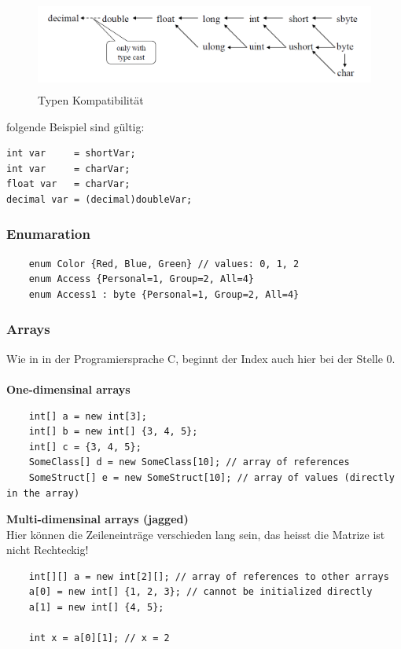\begin{figure}[h]
	\centering
	\includegraphics[height=3cm, ]{images/CSharp/TypenKompatibilitaet}
	\caption{Typen Kompatibilität}
\end{figure}

folgende Beispiel sind gültig:

\begin{lstlisting}
int var     = shortVar;
int var     = charVar;
float var   = charVar;
decimal var = (decimal)doubleVar;
\end{lstlisting}

\subsubsection{Enumaration}
\begin{lstlisting}
	enum Color {Red, Blue, Green} // values: 0, 1, 2
	enum Access {Personal=1, Group=2, All=4}
	enum Access1 : byte {Personal=1, Group=2, All=4}
\end{lstlisting}

\subsubsection{Arrays}
Wie in in der Programiersprache C, beginnt der Index auch hier bei der Stelle 0.\\ \\
\textbf{One-dimensinal arrays}
\begin{lstlisting}
	int[] a = new int[3];
	int[] b = new int[] {3, 4, 5};
	int[] c = {3, 4, 5};
	SomeClass[] d = new SomeClass[10]; // array of references
	SomeStruct[] e = new SomeStruct[10]; // array of values (directly in the array)
\end{lstlisting}

\textbf{Multi-dimensinal arrays (jagged)}\\
Hier können die Zeileneinträge verschieden lang sein, das heisst die Matrize ist nicht Rechteckig!
\begin{lstlisting}
	int[][] a = new int[2][]; // array of references to other arrays
	a[0] = new int[] {1, 2, 3}; // cannot be initialized directly
	a[1] = new int[] {4, 5};
	
	int x = a[0][1]; // x = 2
\end{lstlisting}

